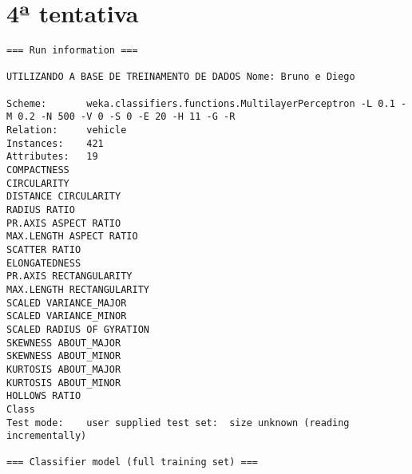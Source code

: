 \documentclass[
	article,			%
	11pt,				%
	oneside,			%
	a4paper,			%
	english,			%
	brazil,				%
	sumario=tradicional
	]{abntex2}
\begin{document}
\section{4ª tentativa}

\begin{lstlisting}
=== Run information ===

UTILIZANDO A BASE DE TREINAMENTO DE DADOS Nome: Bruno e Diego

Scheme:       weka.classifiers.functions.MultilayerPerceptron -L 0.1 -M 0.2 -N 500 -V 0 -S 0 -E 20 -H 11 -G -R
Relation:     vehicle
Instances:    421
Attributes:   19
COMPACTNESS
CIRCULARITY
DISTANCE CIRCULARITY
RADIUS RATIO
PR.AXIS ASPECT RATIO
MAX.LENGTH ASPECT RATIO
SCATTER RATIO
ELONGATEDNESS
PR.AXIS RECTANGULARITY
MAX.LENGTH RECTANGULARITY
SCALED VARIANCE_MAJOR
SCALED VARIANCE_MINOR
SCALED RADIUS OF GYRATION
SKEWNESS ABOUT_MAJOR
SKEWNESS ABOUT_MINOR
KURTOSIS ABOUT_MAJOR
KURTOSIS ABOUT_MINOR
HOLLOWS RATIO
Class
Test mode:    user supplied test set:  size unknown (reading incrementally)

=== Classifier model (full training set) ===


\end{lstlisting}
\end{document}

